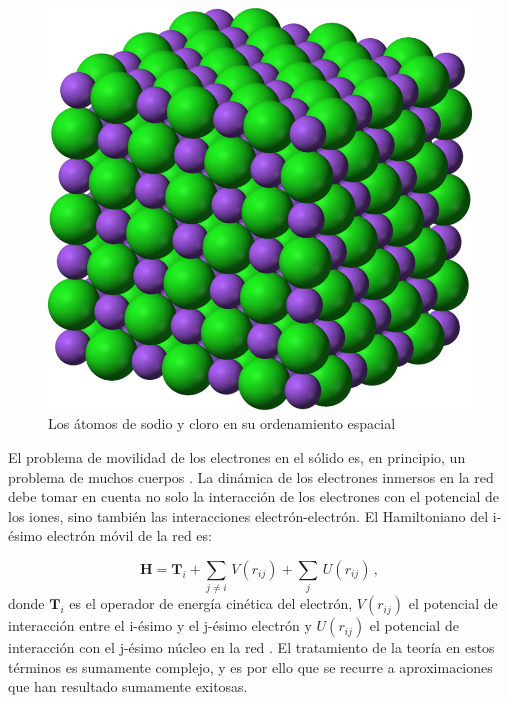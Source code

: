 \begin{figure}[h]
    \centering
    \includegraphics[scale=0.2]{./imagenes/NA-CL-Sodium-chloride-3D-ionic.png}
    \caption{Los átomos de sodio y cloro en su ordenamiento espacial}
    \label{fig:NACL_2}
\end{figure}


El problema de movilidad de los electrones en el sólido es, en principio, un problema de muchos cuerpos \cite{Fetter} \cite{kit_esteroides} . La dinámica de los electrones inmersos en la red debe tomar en cuenta no solo la interacción de los electrones con el potencial de los iones, sino también las interacciones electrón-electrón. El Hamiltoniano del i-ésimo electrón móvil de la red es: 

\begin{equation}
\mathbf{H}=\mathbf{T}_i+\sum_{j\neq{}i}\,V(r_{ij})+\sum_{j}\,U(r_{ij})\,,
\end{equation}
donde $\mathbf{T}_i$ es el operador de energía cinética del electrón, $V(r_{ij})$ el potencial de interacción entre el i-ésimo y el j-ésimo electrón y $U(r_{ij})$ el potencial de interacción con el j-ésimo núcleo en la red \cite{Fetter}. El tratamiento de la teoría en estos términos es sumamente complejo, y es por ello que se recurre a aproximaciones que han resultado sumamente exitosas.

